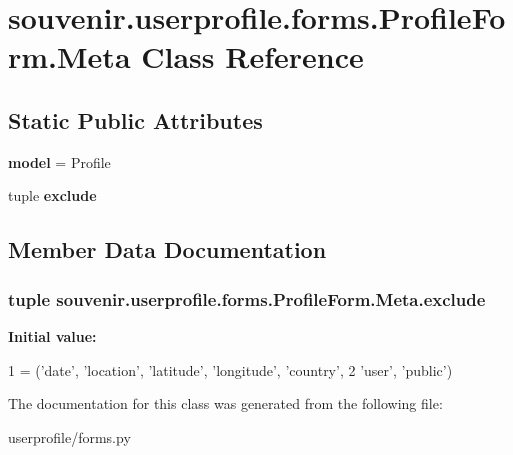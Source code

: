 \hypertarget{classsouvenir_1_1userprofile_1_1forms_1_1ProfileForm_1_1Meta}{\section{souvenir.\-userprofile.\-forms.\-Profile\-Form.\-Meta Class Reference}
\label{classsouvenir_1_1userprofile_1_1forms_1_1ProfileForm_1_1Meta}
}
\subsection*{Static Public Attributes}
\begin{DoxyCompactItemize}
\item 
\hypertarget{classsouvenir_1_1userprofile_1_1forms_1_1ProfileForm_1_1Meta_a7917cc5c14e12849b4efd279b5adbefb}{{\bfseries model} = Profile}\label{classsouvenir_1_1userprofile_1_1forms_1_1ProfileForm_1_1Meta_a7917cc5c14e12849b4efd279b5adbefb}

\item 
tuple {\bfseries exclude}
\end{DoxyCompactItemize}


\subsection{Member Data Documentation}
\hypertarget{classsouvenir_1_1userprofile_1_1forms_1_1ProfileForm_1_1Meta_afbcd5134774d0974f4184eefb952a081}{
\subsubsection[{exclude}]{\setlength{\rightskip}{0pt plus 5cm}tuple souvenir.\-userprofile.\-forms.\-Profile\-Form.\-Meta.\-exclude\hspace{0.3cm}{\ttfamily [static]}}}\label{classsouvenir_1_1userprofile_1_1forms_1_1ProfileForm_1_1Meta_afbcd5134774d0974f4184eefb952a081}
{\bfseries Initial value\-:}
\begin{DoxyCode}
1 = (\textcolor{stringliteral}{'date'}, \textcolor{stringliteral}{'location'}, \textcolor{stringliteral}{'latitude'}, \textcolor{stringliteral}{'longitude'}, \textcolor{stringliteral}{'country'},
2                    \textcolor{stringliteral}{'user'}, \textcolor{stringliteral}{'public'})
\end{DoxyCode}


The documentation for this class was generated from the following file\-:\begin{DoxyCompactItemize}
\item 
userprofile/forms.\-py\end{DoxyCompactItemize}

